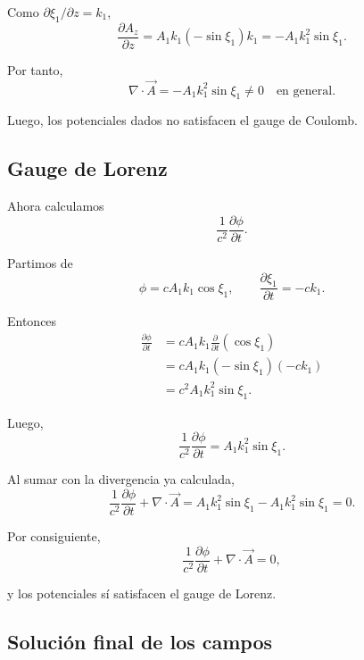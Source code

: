 \documentclass{article}
\numberwithin{equation}{section}
\begin{document}
Como $\partial\xi_1/\partial z=k_1$,
\begin{equation}
\frac{\partial A_z}{\partial z}=A_1k_1(-\sin\xi_1)k_1=-A_1k_1^2\sin\xi_1.
\end{equation}

Por tanto,
\begin{equation}
\boxed{\nabla\cdot\vec A=-A_1k_1^2\sin\xi_1\neq 0 \quad \text{en general}.}
\end{equation}

Luego, los potenciales dados no satisfacen el gauge de Coulomb.

\subsection{Gauge de Lorenz}
Ahora calculamos
\begin{equation}
\frac{1}{c^2}\frac{\partial\phi}{\partial t}.
\end{equation}

Partimos de
\begin{equation}
\phi=cA_1k_1\cos\xi_1,
\qquad
\frac{\partial\xi_1}{\partial t}=-ck_1.
\end{equation}

Entonces
\begin{align}
\frac{\partial\phi}{\partial t}
&=cA_1k_1\frac{\partial}{\partial t}(\cos\xi_1) \\
&=cA_1k_1(-\sin\xi_1)(-ck_1) \\
&=c^2A_1k_1^2\sin\xi_1.
\end{align}

Luego,
\begin{equation}
\frac{1}{c^2}\frac{\partial\phi}{\partial t}=A_1k_1^2\sin\xi_1.
\end{equation}

Al sumar con la divergencia ya calculada,
\begin{equation}
\frac{1}{c^2}\frac{\partial\phi}{\partial t}+\nabla\cdot\vec A
=A_1k_1^2\sin\xi_1-A_1k_1^2\sin\xi_1=0.
\end{equation}

Por consiguiente,
\begin{equation}
\boxed{\frac{1}{c^2}\frac{\partial\phi}{\partial t}+\nabla\cdot\vec A=0,}
\end{equation}

y los potenciales sí satisfacen el gauge de Lorenz.

\subsection{Solución final de los campos}
\end{document}
